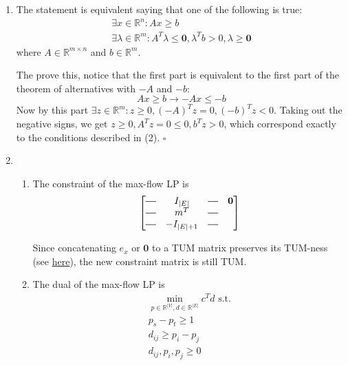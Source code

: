 \documentclass[12pt]{article}
\newcommand*{\horzbar}{\rule[.5ex]{2.5ex}{0.5pt}}
\begin{document}
\begin{enumerate}
      \item The statement is equivalent saying that one of the following is true:
            \begin{gather}
                  \exists x \in \mathbb{R}^n: Ax \ge b \\
                  \exists \lambda \in \mathbb{R}^m: A^T \lambda \le \mathbf{0}, \lambda^Tb > 0, \lambda \ge \mathbf{0}
            \end{gather}
            where $A \in \mathbb{R}^{m \times n}$ and $b \in \mathbb{R}^m$.

            The prove this, notice that the first part is equivalent to the first
            part of the theorem of alternatives with $-A$ and $-b$:
            \[Ax \ge b \rightarrow -Ax \le -b\]
            Now by this part $\exists z \in \mathbb{R}^m: z \ge 0, (-A)^Tz = 0, (-b)^Tz < 0$.
            Taking out the negative signs, we get $z \ge 0, A^Tz=0 \le 0, b^Tz > 0$,
            which correspond exactly to the conditions described in (2). $\square$

      \item \begin{enumerate}
                  \item The constraint of the max-flow LP is
                        \[\begin{bmatrix}
                                    \horzbar & I_{|E|}    & \horzbar & \mathbf{0} \\
                                    \horzbar & m^T        & \horzbar              \\
                                    \horzbar & -I_{|E|+1} & \horzbar
                              \end{bmatrix}\]

                        Since concatenating $e_x$ or $\mathbf{0}$ to a TUM matrix preserves its TUM-ness
                        (see \href{https://math.stackexchange.com/a/3618732/713952}{here}),
                        the new constraint matrix is still TUM.

                  \item The dual of the max-flow LP is
                        \begin{gather*}
                              \min_{p \in \mathbb{R}^{|V|}, d \in \mathbb{R}^{|E|}} c^Td \text{ s.t.} \\
                              p_s - p_t \ge 1 \\
                              d_{ij} \ge p_i - p_j \\
                              d_{ij}, p_i, p_j \ge 0
                        \end{gather*}


\end{enumerate}
\end{enumerate}
\end{document}
